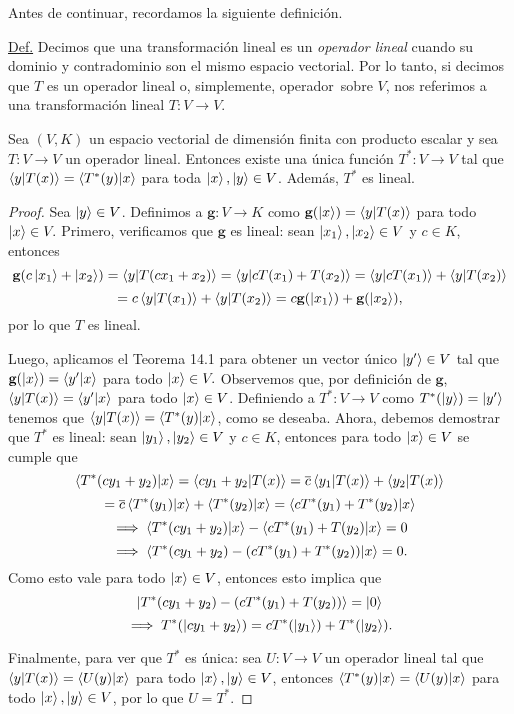 \documentclass[12pt,dvipsnames]{article}
\newenvironment{teorema}[2][Teorema]{\begin{trivlist}
\item[\hskip \labelsep {\bfseries #1}\hskip \labelsep {\bfseries #2.}]}{\end{trivlist}}
\begin{document}
Antes de continuar, recordamos la siguiente definición.

\hspace{5mm} 
\begin{tcolorbox}
    \underline{Def.} Decimos que una transformación lineal es un \emph{operador lineal} cuando su dominio y contradominio son el mismo espacio vectorial. Por lo tanto, si decimos que $T$ es un operador lineal \textemdash o, simplemente, operador\textemdash \ sobre $V$, nos referimos a una transformación lineal $T:V\to V$.
\end{tcolorbox}

\begin{teorema}{14.2}
    Sea $(V,K)$ un espacio vectorial de dimensión finita con producto escalar y sea $T:V\to V$ un operador lineal. Entonces existe una única función $T^*:V\to V$ tal que $\braket{y|T(x)}=\braket{T^*(y)|x}$ para toda $\ket{x},\ket{y}\in V$. Además, $T^*$ es lineal.
    
    \begin{proof}
        Sea $\ket{y}\in V$. Definimos a $\textbf{g}:V\to K$ como $\textbf{g}(\ket{x})=\braket{y|T(x)}$ para todo $\ket{x}\in V.$ Primero, verificamos que $\textbf{g}$ es lineal: sean $\ket{x_1},\ket{x_2}\in V$ y $c\in K$, entonces $$\textbf{g}(c\ket{x_1}+\ket{x_2})=\braket{y|T(cx_1+x_2)}=\braket{y|cT(x_1)+T(x_2)}=\braket{y|cT(x_1)}+\braket{y|T(x_2)}$$ $$=c\braket{y|T(x_1)}+\braket{y|T(x_2)}=c\textbf{g}(\ket{x_1})+\textbf{g}(\ket{x_2}),$$ por lo que $T$ es lineal.
        
        Luego, aplicamos el Teorema 14.1 para obtener un vector único $\ket{y'}\in V$ tal que $\textbf{g}(\ket{x})=\braket{y'|x}$ para todo $\ket{x}\in V.$ Observemos que, por definición de $\textbf{g}$, $\braket{y|T(x)}=\braket{y'|x}$ para todo $\ket{x}\in V$. Definiendo a $T^*:V\to V$ como $T^*(\ket{y})=\ket{y'}$ tenemos que $\braket{y|T(x)}=\braket{T^*(y)|x}$, como se deseaba. Ahora, debemos demostrar que $T^*$ es lineal: sean $\ket{y_1},\ket{y_2}\in V$ y $c\in K$, entonces para todo $\ket{x}\in V$ se cumple que $$\braket{T^*(cy_1+y_2)|x}=\braket{cy_1+y_2|T(x)}=\overline{c}\braket{y_1|T(x)}+\braket{y_2|T(x)}$$ $$=\overline{c}\braket{T^*(y_1)|x}+\braket{T^*(y_2)|x}=\braket{cT^*(y_1)+T^*(y_2)|x}$$ $$\implies\braket{T^*(cy_1+y_2)|x}-\braket{cT^*(y_1)+T(y_2)|x}=0$$ $$\implies \braket{T^*(cy_1+y_2)-(cT^*(y_1)+T^*(y_2))|x}=0.$$ Como esto vale para todo $\ket{x}\in V$, entonces esto implica que $$ \ket{T^*(cy_1+y_2)-(cT^*(y_1)+T(y_2))}=\ket{0}$$ $$\implies T^*(\ket{cy_1+y_2})=cT^*(\ket{y_1})+T^*(\ket{y_2}).$$
        
        Finalmente, para ver que $T^*$ es única: sea $U:V\to V$ un operador lineal tal que $\braket{y|T(x)}=\braket{U(y)|x}$ para todo $\ket{x},\ket{y}\in V$, entonces $\braket{T^*(y)|x}=\braket{U(y)|x}$ para todo $\ket{x},\ket{y}\in V$, por lo que $U=T^*$.
    \end{proof}
\end{teorema}
\end{document}
